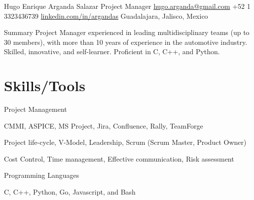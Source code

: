 \documentclass[10pt, letterpaper]{article} %
\begin{document}

\customheader
{Hugo Enrique Arganda Salazar}
{Project Manager}
{\href{mailto:hugo.arganda@gmail.com}{hugo.arganda@gmail.com}}
{+52 1 3323436739}
{\href{https://www.linkedin.com/in/argandas}{linkedin.com/in/argandas}}
{Guadalajara, Jalisco, Mexico}


\summary
{Summary}
{Project Manager experienced in leading multidisciplinary teams (up to 30 members), with more than 10 years of experience in the automotive industry. Skilled, innovative, and self-learner. Proficient in C, C++, and Python.}





\section{Skills/Tools}

\skillgroup
{Project Management}
{
\begin{itemize-bullets}
\item{CMMI, ASPICE, MS Project, Jira, Confluence, Rally, TeamForge}
\item{Project life-cycle, V-Model, Leadership, Scrum (Scrum Master, Product Owner)}
\item{Cost Control, Time management, Effective communication, Risk assessment}
\end{itemize-bullets}
}

\skillgroup
{Programming Languages}
{
\begin{itemize-bullets}
\item{C, C++, Python, Go, Javascript, and Bash}
\end{itemize-bullets}
}

\end{document}
